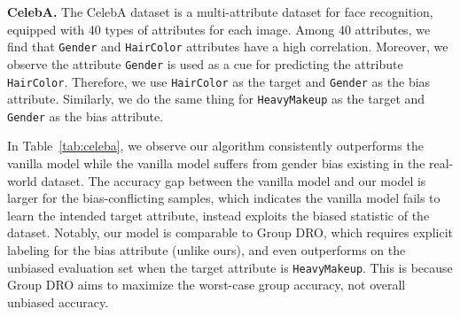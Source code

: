 \begin{table}[t!]
\centering
\caption{
Accuracy evaluated on the unbiased samples and bias-conflicting samples for the CelebA dataset with \texttt{Gender} as the bias attribute.
}
\label{tab:celeba}
\end{table}


%
 \textbf{CelebA.}
The CelebA dataset \citep{liu2015faceattributes} is a multi-attribute dataset for face recognition, equipped with 40 types of attributes for each image. Among 40 attributes, we find that \texttt{Gender} and \texttt{HairColor} attributes have a high correlation. Moreover, we observe the attribute \texttt{Gender} is used as a cue for predicting the attribute \texttt{HairColor}. Therefore, we use \texttt{HairColor} 
as the target and \texttt{Gender} 
as the bias attribute. Similarly, we do the same thing for \texttt{HeavyMakeup} as the target and \texttt{Gender} as the bias attribute.



In Table~\ref{tab:celeba}, we observe our algorithm consistently outperforms the vanilla model while the vanilla model suffers from gender bias existing in the real-world dataset. The accuracy gap between the vanilla model and our model is larger for the bias-conflicting samples, which indicates the vanilla model fails to learn the intended target attribute, instead exploits the biased statistic of the dataset. 
Notably, our model is comparable to Group DRO, which requires explicit labeling for the bias attribute (unlike ours), and even outperforms on the unbiased evaluation set when the target attribute is \texttt{HeavyMakeup}. This is because Group DRO aims to maximize the worst-case group accuracy, not overall unbiased accuracy.




